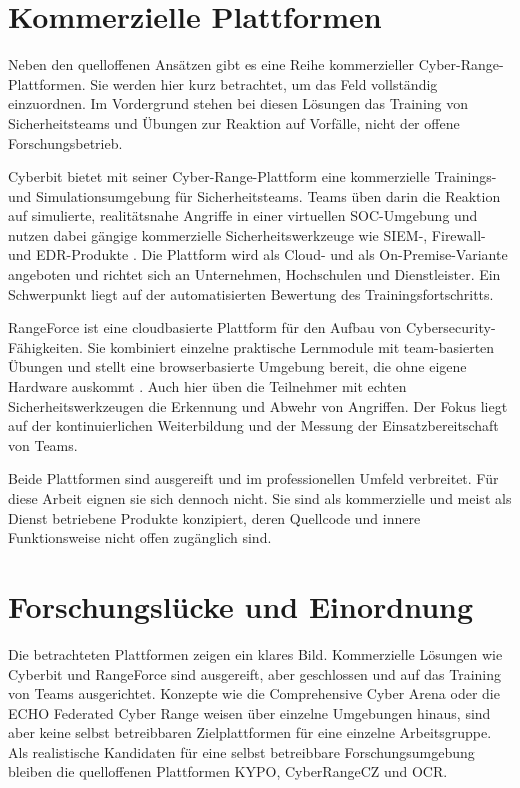 \section{Kommerzielle Plattformen}
\label{sec:kommerziell}

Neben den quelloffenen Ansätzen gibt es eine Reihe kommerzieller Cyber-Range-Plattformen. Sie
werden hier kurz betrachtet, um das Feld vollständig einzuordnen. Im Vordergrund stehen bei diesen
Lösungen das Training von Sicherheitsteams und Übungen zur Reaktion auf Vorfälle, nicht der offene
Forschungsbetrieb.

Cyberbit bietet mit seiner Cyber-Range-Plattform eine kommerzielle Trainings- und
Simulationsumgebung für Sicherheitsteams. Teams üben darin die Reaktion auf simulierte,
realitätsnahe Angriffe in einer virtuellen SOC-Umgebung und nutzen dabei gängige kommerzielle
Sicherheitswerkzeuge wie SIEM-, Firewall- und EDR-Produkte \cite{CyberbitRange}. Die Plattform wird
als Cloud- und als On-Premise-Variante angeboten und richtet sich an Unternehmen, Hochschulen und
Dienstleister. Ein Schwerpunkt liegt auf der automatisierten Bewertung des Trainingsfortschritts.

RangeForce ist eine cloudbasierte Plattform für den Aufbau von Cybersecurity-Fähigkeiten. Sie
kombiniert einzelne praktische Lernmodule mit team-basierten Übungen und stellt eine browserbasierte
Umgebung bereit, die ohne eigene Hardware auskommt \cite{RangeForcePlatform}. Auch hier üben die
Teilnehmer mit echten Sicherheitswerkzeugen die Erkennung und Abwehr von Angriffen. Der Fokus liegt
auf der kontinuierlichen Weiterbildung und der Messung der Einsatzbereitschaft von Teams.

Beide Plattformen sind ausgereift und im professionellen Umfeld verbreitet. Für diese Arbeit eignen
sie sich dennoch nicht. Sie sind als kommerzielle und meist als Dienst betriebene Produkte
konzipiert, deren Quellcode und innere Funktionsweise nicht offen zugänglich sind. 

\section{Forschungslücke und Einordnung}
\label{sec:forschungsluecke}
 
Die betrachteten Plattformen zeigen ein klares Bild. Kommerzielle Lösungen wie Cyberbit und
RangeForce sind ausgereift, aber geschlossen und auf das Training von Teams ausgerichtet. Konzepte
wie die Comprehensive Cyber Arena oder die ECHO Federated Cyber Range weisen über einzelne
Umgebungen hinaus, sind aber keine selbst betreibbaren Zielplattformen für eine einzelne
Arbeitsgruppe. Als realistische Kandidaten für eine selbst betreibbare Forschungsumgebung bleiben
die quelloffenen Plattformen KYPO, CyberRangeCZ und OCR.
 
